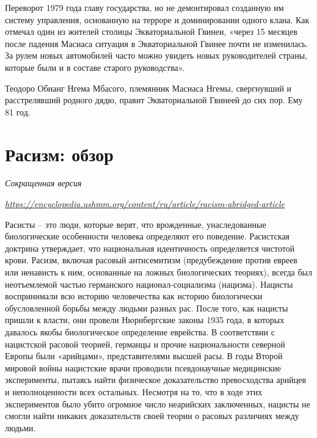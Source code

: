 Переворот 1979 года  главу государства, но не демонтировал созданную им систему управления, основанную на терроре и доминировании одного клана. Как отмечал один из жителей столицы Экваториальной Гвинеи, «через 15 месяцев после падения Масиаса ситуация в Экваториальной Гвинее почти не изменилась. За рулем новых автомобилей часто можно увидеть новых руководителей страны, которые были и в составе старого руководства».

\begin{fancyquotes}
    Теодоро Обианг Нгема Мбасого, племянник Масиаса Нгемы, свергнувший и расстрелявший родного дядю, правит Экваториальной Гвинеей до сих пор. Ему 81 год.
\end{fancyquotes}



\clearpage


\section{Расизм: обзор}

\textit{Сокращенная версия}

\textit{\url{https://encyclopedia.ushmm.org/content/ru/article/racism-abridged-article}}


Расисты – это люди, которые верят, что врожденные, унаследованные биологические особенности человека определяют его поведение. Расистская доктрина утверждает, что национальная идентичность определяется чистотой крови. Расизм, включая расовый антисемитизм (предубеждение против евреев или ненависть к ним, основанные на ложных биологических теориях), всегда был неотъемлемой частью германского национал-социализма (нацизма). Нацисты воспринимали всю историю человечества как историю биологически обусловленной борьбы между людьми разных рас. После того, как нацисты пришли к власти, они провели Нюрнбергские законы 1935 года, в которых давалось якобы биологическое определение еврейства. В соответствии с нацистской расовой теорией, германцы и прочие национальности северной Европы были «арийцами», представителями высшей расы. В годы Второй мировой войны нацистские врачи проводили псевдонаучные медицинские эксперименты, пытаясь найти физическое доказательство превосходства арийцев и неполноценности всех остальных. Несмотря на то, что в ходе этих экспериментов было убито огромное число неарийских заключенных, нацисты не смогли найти никаких доказательств своей теории о расовых различиях между людьми.

